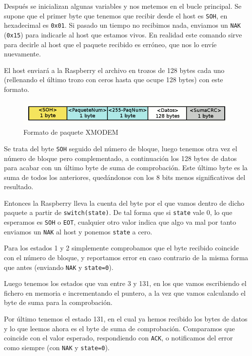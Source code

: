Después se inicializan algunas variables y nos metemos en el bucle principal. Se supone que el
primer byte que tenemos que recibir desde el host es {\tt SOH}, en hexadecimal es {\tt 0x01}.
Si pasado un tiempo no recibimos nada, enviamos un {\tt NAK} ({\tt 0x15}) para indicarle al host
que estamos vivos. En realidad este comando sirve para decirle al host que el paquete recibido
es erróneo, que nos lo envíe nuevamente.

El host enviará a la Raspberry el archivo en trozos de 128 bytes cada uno (rellenando el último
trozo con ceros hasta que ocupe 128 bytes) con este formato.

\begin{figure}[h]
  \centering
    \includegraphics[width=14cm]{graphs/xmodem.png}
  \caption{Formato de paquete XMODEM}
  \label{fig:xmodem}
\end{figure}

Se trata del byte {\tt SOH} seguido del número de bloque, luego tenemos otra vez el número de
bloque pero complementado, a continuación los 128 bytes de datos para acabar con un último byte
de suma de comprobación. Este último byte es la suma de todos los anteriores, quedándonos con
los 8 bits menos significativos del resultado.

Entonces la Raspberry lleva la cuenta del byte por el que vamos dentro de dicho paquete a
partir de {\tt switch(state)}. De tal forma que si {\tt state} vale 0, lo que esperamos es
{\tt SOH} o {\tt EOT}, cualquier otro valor indica que algo va mal por tanto enviamos un
{\tt NAK} al host y ponemos {\tt state} a cero.

Para los estados 1 y 2 simplemente comprobamos que el byte recibido coincide con el número
de bloque, y reportamos error en caso contrario de la misma forma que antes (enviando
{\tt NAK} y {\tt state=0}).

Luego tenemos los estados que van entre 3 y 131, en los que vamos escribiendo el fichero en
memoria e incrementando el puntero, a la vez que vamos calculando el byte de suma para
la comprobación.

Por último tenemos el estado 131, en el cual ya hemos recibido los bytes de datos y lo que
leemos ahora es el byte de suma de comprobación. Comparamos que coincide con el valor esperado,
respondiendo con {\tt ACK}, o notificamos del error como siempre (con {\tt NAK} y {\tt state=0}).

